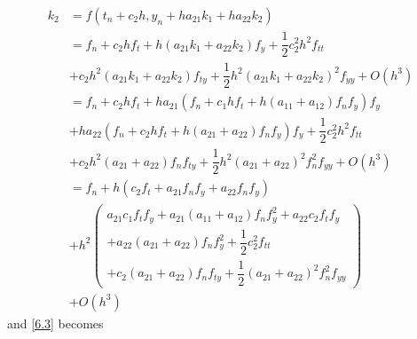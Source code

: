 \documentclass[a4paper,oneside]{book}
\numberwithin{equation}{chapter}
\begin{document}
\begin{align}
{k_2} &= f\left( {{t_n} + {c_2}h,{y_n} + h{a_{21}}{k_1} + h{a_{22}}{k_2}} \right)\\
 &= {f_n} + {c_2}h{f_t} + h\left( {{a_{21}}{k_1} + {a_{22}}{k_2}} \right){f_y} + \dfrac{1}{2}c_2^2{h^2}{f_{tt}}\\
 &+ {c_2}{h^2}\left( {{a_{21}}{k_1} + {a_{22}}{k_2}} \right){f_{ty}} + \dfrac{1}{2}{h^2}{\left( {{a_{21}}{k_1} + {a_{22}}{k_2}} \right)^2}{f_{yy}} + O\left( {{h^3}} \right)\\
& = {f_n} + {c_2}h{f_t} + h{a_{21}}\left( {{f_n} + {c_1}h{f_t} + h\left( {{a_{11}} + {a_{12}}} \right){f_n}{f_y}} \right){f_y}\\
& + h{a_{22}}\left( {{f_n} + {c_2}h{f_t} + h\left( {{a_{21}} + {a_{22}}} \right){f_n}{f_y}} \right){f_y} + \dfrac{1}{2}c_2^2{h^2}{f_{tt}}\\
& + {c_2}{h^2}\left( {{a_{21}} + {a_{22}}} \right){f_n}{f_{ty}} + \dfrac{1}{2}{h^2}{\left( {{a_{21}} + {a_{22}}} \right)^2}f_n^2{f_{yy}} + O\left( {{h^3}} \right)\\
& = {f_n} + h\left( {{c_2}{f_t} + {a_{21}}{f_n}{f_y} + {a_{22}}{f_n}{f_y}} \right)\\
& + {h^2}\left( \begin{array}{l}
{a_{21}}{c_1}{f_t}{f_y} + {a_{21}}\left( {{a_{11}} + {a_{12}}} \right){f_n}f_y^2 + {a_{22}}{c_2}{f_t}{f_y}\\
 + {a_{22}}\left( {{a_{21}} + {a_{22}}} \right){f_n}f_y^2 + \dfrac{1}{2}c_2^2{f_{tt}}\\
 + {c_2}\left( {{a_{21}} + {a_{22}}} \right){f_n}{f_{ty}} + \dfrac{1}{2}{\left( {{a_{21}} + {a_{22}}} \right)^2}f_n^2{f_{yy}}
\end{array} \right)\\
& + O\left( {{h^3}} \right)
\end{align}
and \eqref{6.3} becomes
\end{document}
